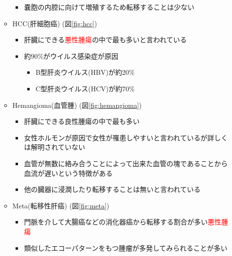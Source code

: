 \documentclass[a4j]{ujarticle}
\newcommand{\Fref}[1]{\mbox{図\ref{fig:#1}}}
\begin{document}
\begin{itemize}
\begin{itemize}
\begin{itemize}
                    \item 嚢胞の内腔に向けて増殖するため転移することは少ない
                \end{itemize}
                \item HCC(肝細胞癌) (\Fref{hcc})
                \begin{itemize}
                    \item 肝臓にできる\textcolor{red}{悪性腫瘍}の中で最も多いと言われている
                    \item 約90\%がウイルス感染症が原因
                    \begin{itemize}
                        \item B型肝炎ウイルス(HBV)が約20\%
                        \item C型肝炎ウイルス(HCV)が約70\%
                    \end{itemize}
                \end{itemize}
                \item Hemangioma(血管腫) (\Fref{hemangioma})
                \begin{itemize}
                    \item 肝臓にできる良性腫瘍の中で最も多い
                    \item 女性ホルモンが原因で女性が罹患しやすいと言われているが詳しくは解明されていない
                    \item 血管が無数に絡み合うことによって出来た血管の塊であることから血流が遅いという特徴がある
                    \item 他の臓器に浸潤したり転移することは無いと言われている
                \end{itemize}
                \item Meta(転移性肝癌) (\Fref{meta})
                \begin{itemize}
                    \item 門脈を介して大腸癌などの消化器癌から転移する割合が多い\textcolor{red}{悪性腫瘍}
                    \item 類似したエコーパターンをもつ腫瘤が多発してみられることが多い
                \end{itemize}
            \end{itemize}
        \end{itemize}
\end{document}
